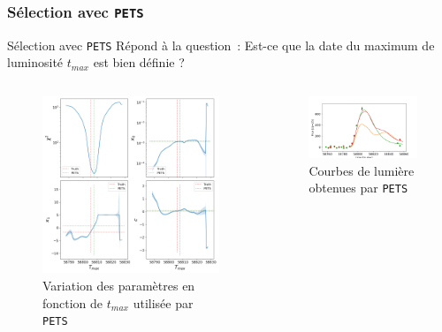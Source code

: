 \documentclass{beamer}
\def\pets{\texttt{PETS}\xspace}
\begin{document}
\subsubsection{Sélection avec \pets}

\begin{frame}{Sélection avec \pets}
Répond à la question~: Est-ce que la date du maximum de luminosité $t_{max}$ est bien définie ? 
\begin{columns}
\begin{column}{.5\textwidth}
\begin{figure}
	\centering
	\includegraphics[width=.8\textwidth]{figures/10_pets.png}
	\caption{Variation des paramètres en fonction de $t_{max}$ utilisée par \pets}
\end{figure}
\end{column}
\begin{column}{.5\textwidth}
\begin{figure}
	\centering
	\includegraphics[width=.9\textwidth]{figures/10_lc_pets_new.png}
	\caption{Courbes de lumière obtenues par \pets}
\end{figure}
\end{column}
\end{columns}
\end{frame}
\end{document}
